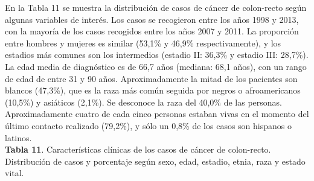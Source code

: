 En la Tabla 11 se muestra  la distribución de casos de cáncer de colon-recto según algunas variables de interés. Los casos se recogieron entre los años 1998 y 2013, con la mayoría de los casos recogidos entre los años 2007 y 2011. La proporción entre hombres y mujeres es similar (53,1\% y 46,9\% respectivamente), y los estadios más comunes son los intermedios (estadio II: 36,3\% y estadio III: 28,7\%). La edad media de diagnóstico es de 66,7 años (mediana: 68,1 años), con un rango de edad de entre 31 y 90 años. Aproximadamente la mitad de los pacientes son blancos (47,3\%), que es la raza más común seguida por negros o afroamericanos (10,5\%) y asiáticos (2,1\%). Se desconoce la raza del 40,0\% de las personas. Aproximadamente cuatro de cada cinco personas estaban vivas en el momento del último contacto realizado (79,2\%), y sólo un 0,8\% de los casos son hispanos o latinos.\\

\newpage
\textbf{Tabla 11}. Características clínicas de los casos de cáncer de colon-recto. Distribución de casos y porcentaje según sexo, edad, estadio, etnia, raza y estado vital.

